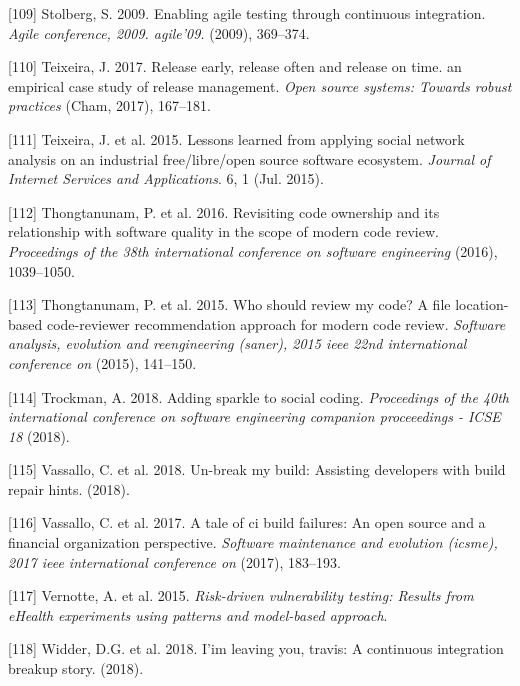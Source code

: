 \documentclass[]{book}
\begin{document}
\hypertarget{ref-stolberg2009enabling}{}
{[}109{]} Stolberg, S. 2009. Enabling agile testing through continuous
integration. \emph{Agile conference, 2009. agile'09.} (2009), 369--374.

\hypertarget{ref-teixeira2017a}{}
{[}110{]} Teixeira, J. 2017. Release early, release often and release on
time. an empirical case study of release management. \emph{Open source
systems: Towards robust practices} (Cham, 2017), 167--181.

\hypertarget{ref-Teixeira2015}{}
{[}111{]} Teixeira, J. et al. 2015. Lessons learned from applying social
network analysis on an industrial free/libre/open source software
ecosystem. \emph{Journal of Internet Services and Applications}. 6, 1
(Jul. 2015).

\hypertarget{ref-thongtanunam2016revisiting}{}
{[}112{]} Thongtanunam, P. et al. 2016. Revisiting code ownership and
its relationship with software quality in the scope of modern code
review. \emph{Proceedings of the 38th international conference on
software engineering} (2016), 1039--1050.

\hypertarget{ref-thongtanunam2015should}{}
{[}113{]} Thongtanunam, P. et al. 2015. Who should review my code? A
file location-based code-reviewer recommendation approach for modern
code review. \emph{Software analysis, evolution and reengineering
(saner), 2015 ieee 22nd international conference on} (2015), 141--150.

\hypertarget{ref-Trockman2018}{}
{[}114{]} Trockman, A. 2018. Adding sparkle to social coding.
\emph{Proceedings of the 40th international conference on software
engineering companion proceeedings - ICSE 18} (2018).

\hypertarget{ref-vassallo2018break}{}
{[}115{]} Vassallo, C. et al. 2018. Un-break my build: Assisting
developers with build repair hints. (2018).

\hypertarget{ref-vassallo2017tale}{}
{[}116{]} Vassallo, C. et al. 2017. A tale of ci build failures: An open
source and a financial organization perspective. \emph{Software
maintenance and evolution (icsme), 2017 ieee international conference
on} (2017), 183--193.

\hypertarget{ref-vernotte2015}{}
{[}117{]} Vernotte, A. et al. 2015. \emph{Risk-driven vulnerability
testing: Results from eHealth experiments using patterns and model-based
approach}.

\hypertarget{ref-widder2018m}{}
{[}118{]} Widder, D.G. et al. 2018. I'im leaving you, travis: A
continuous integration breakup story. (2018).
\end{document}
